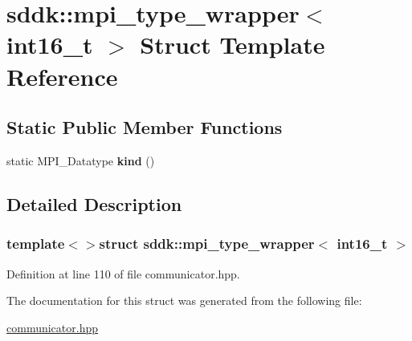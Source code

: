 \hypertarget{structsddk_1_1mpi__type__wrapper_3_01int16__t_01_4}{}\section{sddk\+:\+:mpi\+\_\+type\+\_\+wrapper$<$ int16\+\_\+t $>$ Struct Template Reference}
\label{structsddk_1_1mpi__type__wrapper_3_01int16__t_01_4}
\subsection*{Static Public Member Functions}
\begin{DoxyCompactItemize}
\item 
\hypertarget{structsddk_1_1mpi__type__wrapper_3_01int16__t_01_4_a57d3d8d9b27c10245d85c528a9d43196}{}static M\+P\+I\+\_\+\+Datatype {\bfseries kind} ()\label{structsddk_1_1mpi__type__wrapper_3_01int16__t_01_4_a57d3d8d9b27c10245d85c528a9d43196}

\end{DoxyCompactItemize}


\subsection{Detailed Description}
\subsubsection*{template$<$$>$struct sddk\+::mpi\+\_\+type\+\_\+wrapper$<$ int16\+\_\+t $>$}



Definition at line 110 of file communicator.\+hpp.



The documentation for this struct was generated from the following file\+:\begin{DoxyCompactItemize}
\item 
\hyperlink{communicator_8hpp}{communicator.\+hpp}\end{DoxyCompactItemize}
